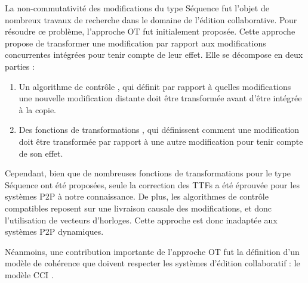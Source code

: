 La non-commutativité des modifications du type Séquence fut l'objet de nombreux travaux de recherche dans le domaine de l'édition collaborative.
Pour résoudre ce problème, l'approche \ac{OT} \cite{1989-grove-ellis-gibbs, 1998-ot-issues-algorithms-achievements-sun} fut initialement proposée.
Cette approche propose de transformer une modification par rapport aux modifications concurrentes intégrées pour tenir compte de leur effet.
Elle se décompose en deux parties :
\begin{enumerate}
  \item Un algorithme de contrôle \cite{1996-adopted-ressel-nitsch-ruhland-gunzenhauser, 1996-reduce-sun-yang-zhang-chen, 2009-cot-sun}, qui définit par rapport à quelles modifications une nouvelle modification distante doit être transformée avant d'être intégrée à la copie.
  \item Des fonctions de transformations \cite{1989-grove-ellis-gibbs,1996-adopted-ressel-nitsch-ruhland-gunzenhauser,1998-got-sun-jia-zhang-yang-chen,2006-tombstone-transformation-functions-oster}, qui définissent comment une modification doit être transformée par rapport à une autre modification pour tenir compte de son effet.
\end{enumerate}

Cependant, bien que de nombreuses fonctions de transformations pour le type Séquence ont été proposées, seule la correction des \acfp{TTF} \cite{2006-tombstone-transformation-functions-oster} a été éprouvée pour les systèmes \ac{P2P} à notre connaissance.
De plus, les algorithmes de contrôle compatibles reposent sur une livraison causale des modifications, et donc l'utilisation de vecteurs d'horloges.
Cette approche est donc inadaptée aux systèmes \ac{P2P} dynamiques.

Néanmoins, une contribution importante de l'approche \ac{OT} fut la définition d'un modèle de cohérence que doivent respecter les systèmes d'édition collaboratif : le modèle \ac{CCI} \cite{1998-cci-sun}.

